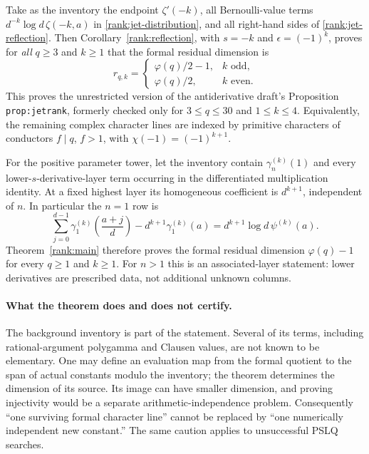 Take as the inventory the endpoint $\zeta'(-k)$, all Bernoulli-value
terms $d^{-k}\log d\,\zeta(-k,a)$ in
\eqref{rank:jet-distribution}, and all right-hand sides of
\eqref{rank:jet-reflection}.  Then
Corollary~\ref{rank:reflection}, with $s=-k$ and $\epsilon=(-1)^k$,
proves for \emph{all} $q\geq3$ and $k\geq1$ that the formal residual
dimension is
\begin{equation}\label{rank:negative-result}
 r_{q,k}=\begin{cases}
  \varphi(q)/2-1,&k\text{ odd},\\
  \varphi(q)/2,&k\text{ even}.
 \end{cases}
\end{equation}
This proves the unrestricted version of the antiderivative draft's
Proposition \texttt{prop:jetrank}, formerly checked only for
$3\leq q\leq30$ and $1\leq k\leq4$.  Equivalently, the remaining
complex character lines are indexed by primitive characters of
conductors $f\mid q$, $f>1$, with $\chi(-1)=(-1)^{k+1}$.

For the positive parameter tower, let the inventory contain
$\gamma_n^{(k)}(1)$ and every lower-$s$-derivative-layer term occurring
in the differentiated multiplication identity.  At a fixed highest
layer its homogeneous coefficient is $d^{k+1}$, independent of $n$.
In particular the $n=1$ row is
\[
 \sum_{j=0}^{d-1}\gamma_1^{(k)}\left(\frac{a+j}{d}\right)
 -d^{k+1}\gamma_1^{(k)}(a)
 =d^{k+1}\log d\,\psi^{(k)}(a).
\]
Theorem~\ref{rank:main} therefore proves the formal residual dimension
$\varphi(q)-1$ for every $q\geq1$ and $k\geq1$.  For $n>1$ this is
an associated-layer statement: lower derivatives are prescribed data,
not additional unknown columns.

\paragraph{What the theorem does and does not certify.}
The background inventory is part of the statement.  Several of its
terms, including rational-argument polygamma and Clausen values, are
not known to be elementary.  One may define an evaluation map from the
formal quotient to the span of actual constants modulo the inventory;
the theorem determines the dimension of its source.  Its image can
have smaller dimension, and proving injectivity would be a separate
arithmetic-independence problem.  Consequently ``one surviving formal
character line'' cannot be replaced by ``one numerically independent
new constant.''  The same caution applies to unsuccessful PSLQ searches.

